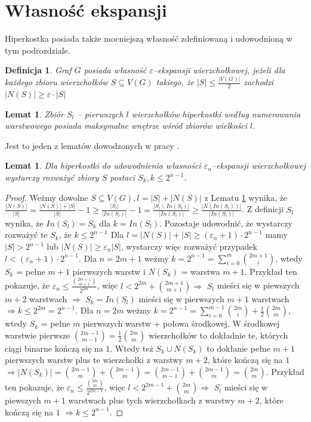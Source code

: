\documentclass{pracamgr}
\newtheorem{defi}[theorem]{Definicja} %
\newtheorem{lemma}[theorem]{Lemat}
\begin{document}
  \section{Własność ekspansji}
   Hiperkostka posiada także mocniejszą własność zdefiniowaną i udowodnioną w tym podrozdziale.
   \begin{defi}\label{epsilon ekspansja wierzcholkowa}
    Graf $G$ posiada własność \emph{$\varepsilon$--ekspansji wierzchołkowej}, jeżeli dla każdego zbioru wierzchołków $S\subseteq V(G)$ takiego,
    że $|S|\le\frac{|V(G)|}{2}$ zachodzi $|N(S)|\ge\varepsilon\cdot|S|$
   \end{defi}
   \begin{lemma}\label{HAR1}
    Zbiór $S_l$ -- pierwszych $l$ wierzchołków hiperkostki według numerowania warstwowego posiada maksymalne wnętrze wśród zbiorów wielkości $l$.  
   \end{lemma}
   Jest to jeden z lematów dowodzonych w pracy \cite{HAR}.
   \begin{lemma}\label{S->S_k}
    Dla hiperkostki do udowodnienia własności $\varepsilon_n$--ekspansji wierzchołkowej wystarczy rozważyć zbiory $S$ postaci $S_k,k\le 2^{n-1}$.
   \end{lemma}
   \begin{proof}
    Weżmy dowolne $S\subseteq V(G), l=|S|+|N(S)|$ z Lematu \ref{HAR1} wynika, że
    $\frac{|N(S)|}{|S|}=\frac{|N(S)|+|S|}{|S|}-1\ge\frac{|S_l|}{|In(S_l)|}-1=\frac{|S_l\backslash In(S_l)|}{|In(S_l)|}\ge\frac{|N(In(S_l))|}{|In(S_l)|}$.
    Z definicji $S_l$ wynika, że $In(S_l)=S_k$ dla $k=In(S_l)$.\newline
    Pozostaje udowodnić, że wystarczy rozważyć te $S_k$, że $k\le2^{n-1}$\newline
    Dla $l=|N(S)|+|S|\ge(\varepsilon_n+1)\cdot 2^{n-1}$ mamy $|S|>2^{n-1}$ lub $|N(S)|\ge\varepsilon_n|S|$, wystarczy więc rozważyć przypadek
    $l<(\varepsilon_n+1)\cdot 2^{n-1}$.\newline
    Dla $n=2m+1$ weżmy $k=2^{n-1}=\sum_{i=0}^{m}{2m+1 \choose i}$, wtedy $S_k$ = pełne $m+1$ pierwszych warstw i $N(S_k)$ = warstwa $m+1$.
    Przykład ten pokazuje, że $\varepsilon_n\le\frac{{2m+1 \choose m+1}}{2^{2m}}$,
    więc $l<2^{2m}+{2m+1 \choose m+1}\Rightarrow$ $S_l$ mieści się w piewszych $m+2$ warstwach
    $\Rightarrow$ $S_k=In(S_l)$ mieści się w pierwszych $m+1$ warstwach $\Rightarrow k\le 2^{2m}=2^{n-1}$.\newline
    Dla $n=2m$ weżmy $k=2^{n-1}=\sum_{i=0}^{m-1}{2m \choose i}+\frac{1}{2}{2m\choose m}$, wtedy $S_k$ = pełne $m$ pierwszych warstw + połowa środkowej.
    W środkowej warstwie pierwsze ${2m-1\choose m-1}=\frac{1}{2}{2m \choose m}$ wierzchołków to dokładnie te, których ciągi binarne kończą się na $1$.
    Wtedy też $S_k\cup N(S_k)$ to dokłanie pełne $m+1$ pierwszych warstw plus te wierzchołki z warstwy $m+2$, które kończą się na $1$
    $\Rightarrow |N(S_k)|={2m-1\choose m}+{2m-1\choose m}={2m-1\choose m-1}+{2m-1 \choose m}={2m\choose m}$.
    Przykład ten pokazuje, że $\varepsilon_n\le\frac{{2m \choose m}}{2^{2m-1}}$,
    więc $l<2^{2m-1}+{2m \choose m}\Rightarrow$ $S_l$ mieści się w piewszych $m+1$ warstwach plus tych wierzchołkach z warstwy $m+2$, które kończą się na $1$
    $\Rightarrow k\le2^{n-1}$.
   \end{proof}
\end{document}
